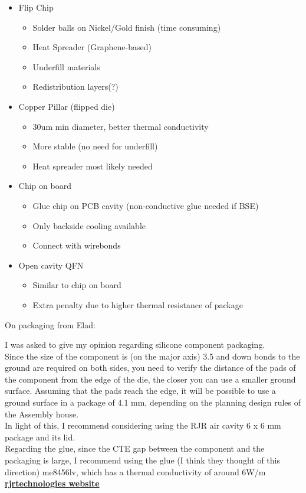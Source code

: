 \documentclass{article}
\begin{document}
\begin{itemize}
	\item Flip Chip
	\begin{itemize}
		\item Solder balls on Nickel/Gold finish (time consuming) %
		\item Heat Spreader (Graphene-based)
		\item Underfill materials
		\item Redistribution layers(?)
	\end{itemize}
	\item Copper Pillar (flipped die)
	\begin{itemize}
		\item 30um min diameter, better thermal conductivity
		\item More stable (no need for underfill)
		\item Heat spreader most likely needed
	\end{itemize}
	\item Chip on board
	\begin{itemize}
		\item Glue chip on PCB cavity (non-conductive glue needed if BSE)
		\item Only backside cooling available
		\item Connect with wirebonds
	\end{itemize}
	\item Open cavity QFN
	\begin{itemize}
		\item Similar to chip on board
		\item Extra penalty due to higher thermal resistance of package
	\end{itemize}
\end{itemize}

On packaging from Elad:

\begin{info}
	I was asked to give my opinion regarding silicone component packaging.\\
	Since the size of the component is (on the major axis) 3.5 and down bonds to the ground are required on both sides, you need to verify the distance of the pads of the component from the edge of the die, the closer you can use a smaller ground surface. Assuming that the pads reach the edge, it will be possible to use a ground surface in a package of  4.1 \unit{mm}, depending on the planning design rules of the Assembly house. \\
	In light of this, I recommend considering using the RJR air cavity 6 x 6 \unit{mm} package and its lid. \\
	Regarding the glue, since the CTE gap between the component and the packaging is large, I recommend using the glue (I think they thought of this direction) me8456lv, which has a thermal conductivity of around 6W/m \\
	\href{https://www.rjrtechnologies.com/}{\textbf{rjrtechnologies website}}
\end{info}
\end{document}
